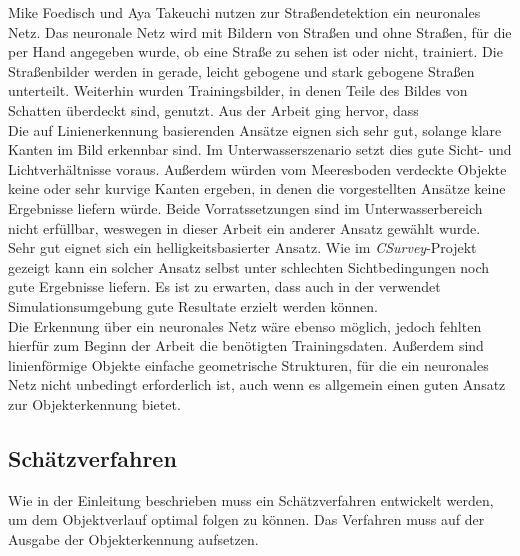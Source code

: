 Mike Foedisch und Aya Takeuchi nutzen zur Straßendetektion ein neuronales Netz. Das neuronale Netz wird mit Bildern von Straßen und ohne Straßen, für die per Hand angegeben wurde, ob eine Straße zu sehen ist oder nicht, trainiert. Die Straßenbilder werden in gerade, leicht gebogene und stark gebogene Straßen unterteilt. Weiterhin wurden Trainingsbilder, in denen Teile des Bildes von Schatten überdeckt sind, genutzt. Aus der Arbeit ging hervor, dass \\


Die auf Linienerkennung basierenden Ansätze eignen sich sehr gut, solange klare Kanten im Bild erkennbar sind. Im Unterwasserszenario setzt dies gute Sicht- und Lichtverhältnisse voraus. Außerdem würden vom Meeresboden verdeckte Objekte keine oder sehr kurvige Kanten ergeben, in denen die vorgestellten Ansätze keine Ergebnisse liefern würde. Beide Vorratssetzungen sind im Unterwasserbereich nicht erfüllbar, weswegen in dieser Arbeit ein anderer Ansatz gewählt wurde.\\
Sehr gut eignet sich ein helligkeitsbasierter Ansatz. Wie im \textit{CSurvey}-Projekt\cite{Albiez2015CSurveyA} gezeigt kann ein solcher Ansatz selbst unter schlechten Sichtbedingungen noch gute Ergebnisse liefern. Es ist zu erwarten, dass auch in der verwendet Simulationsumgebung gute Resultate erzielt werden können.\\
Die Erkennung über ein neuronales Netz wäre ebenso möglich, jedoch fehlten hierfür zum Beginn der Arbeit die benötigten Trainingsdaten. Außerdem sind linienförmige Objekte einfache geometrische Strukturen, für die ein neuronales Netz nicht unbedingt erforderlich ist, auch wenn es allgemein einen guten Ansatz zur Objekterkennung bietet.
\subsection{Schätzverfahren}
Wie in der Einleitung beschrieben muss ein Schätzverfahren entwickelt werden, um dem Objektverlauf optimal folgen zu können. Das Verfahren muss auf der Ausgabe der Objekterkennung aufsetzen.
